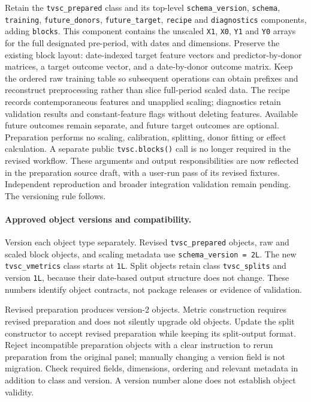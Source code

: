 \documentclass[11pt]{article}
\begin{document}
Retain the \texttt{tvsc\_prepared} class and its top-level
\texttt{schema\_version}, \texttt{schema}, \texttt{training},
\texttt{future\_donors}, \texttt{future\_target}, \texttt{recipe} and
\texttt{diagnostics} components, adding \texttt{blocks}. This component
contains the unscaled \texttt{X1}, \texttt{X0}, \texttt{Y1} and
\texttt{Y0} arrays for the full designated pre-period, with dates and
dimensions. Preserve the existing block layout: date-indexed target
feature vectors and predictor-by-donor matrices, a target outcome vector,
and a date-by-donor outcome matrix. Keep the ordered raw training table
so subsequent operations can obtain prefixes and reconstruct preprocessing
rather than slice full-period scaled data. The recipe records
contemporaneous features and unapplied scaling; diagnostics retain
validation results and constant-feature flags without deleting features.
Available future outcomes remain separate, and future target outcomes
are optional. Preparation performs no scaling, calibration, splitting,
donor fitting or effect calculation. A separate public
\texttt{tvsc.blocks()} call is no longer required in the revised workflow.
These arguments and output responsibilities are now reflected in the
preparation source draft, with a user-run pass of its revised fixtures.
Independent reproduction and broader integration validation remain pending.
The versioning rule follows.

\paragraph{Approved object versions and compatibility.}
Version each object type separately. Revised \texttt{tvsc\_prepared}
objects, raw and scaled block objects, and scaling metadata use
\texttt{schema\_version = 2L}. The new \texttt{tvsc\_vmetrics} class
starts at \texttt{1L}. Split objects retain class \texttt{tvsc\_splits}
and version \texttt{1L}, because their date-based output structure does
not change. These numbers identify object contracts, not package releases
or evidence of validation.

Revised preparation produces version-2 objects. Metric construction
requires revised preparation and does not silently upgrade old objects.
Update the split constructor to accept revised preparation while keeping
its split-output format. Reject incompatible preparation objects with a
clear instruction to rerun preparation from the original panel; manually
changing a version field is not migration. Check required fields,
dimensions, ordering and relevant metadata in addition to class and
version. A version number alone does not establish object validity.
\end{document}
